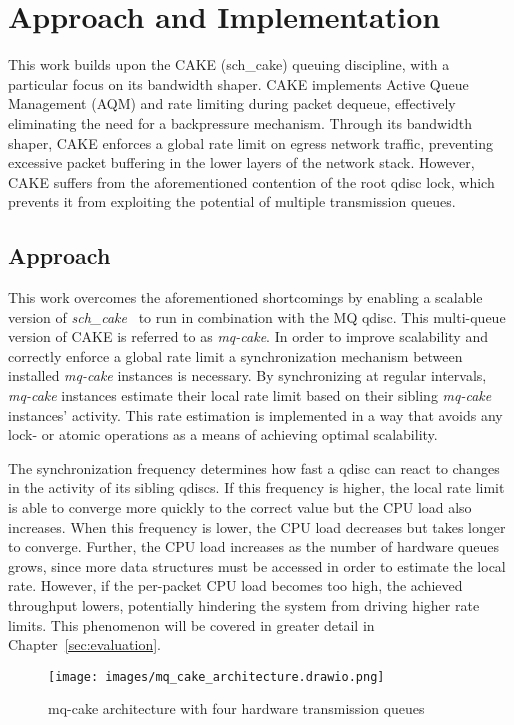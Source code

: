\section{Approach and Implementation}
This work builds upon the CAKE (sch\_cake) queuing discipline, with a particular focus on its bandwidth shaper. CAKE implements Active Queue Management (AQM) and rate limiting during packet dequeue, effectively eliminating the need for a backpressure mechanism. Through its bandwidth shaper, CAKE enforces a global rate limit on egress network traffic, preventing excessive packet buffering in the lower layers of the network stack. However, CAKE suffers from the aforementioned contention of the root qdisc lock, which prevents it from exploiting the potential of multiple transmission queues.

\subsection{Approach}
This work overcomes the aforementioned shortcomings by enabling a scalable version of \textit{sch\_cake}~\cite{cake} to run in combination with the MQ qdisc.
%
This multi-queue version of CAKE is referred to as \textit{mq-cake}.
In order to improve scalability and correctly enforce a global rate limit a synchronization mechanism between installed \textit{mq-cake} instances is necessary.
%
By synchronizing at regular intervals, \textit{mq-cake} instances estimate their local rate limit based on their sibling \textit{mq-cake} instances' activity.  
%
This rate estimation is implemented in a way that avoids any lock- or atomic operations as a means of achieving optimal scalability.
%

The synchronization frequency determines how fast a qdisc can react to changes in the activity of its sibling qdiscs.
If this frequency is higher, the local rate limit is able to converge more quickly to the correct value but the CPU load also increases.
When this frequency is lower, the CPU load decreases but takes longer to converge.
%
Further, the CPU load increases as the number of hardware queues grows, since more data structures must be accessed in order to estimate the local rate.
%
However, if the per-packet CPU load becomes too high, the achieved throughput lowers, potentially hindering the system from driving higher rate limits.
This phenomenon will be covered in greater detail in Chapter~\ref{sec:evaluation}.

\begin{figure}[h]
    \centering
    \texttt{[image: images/mq\_cake\_architecture.drawio.png]}
    \caption{mq-cake architecture with four hardware transmission queues}\label{fig:mq_cake_architecture}
\end{figure}

